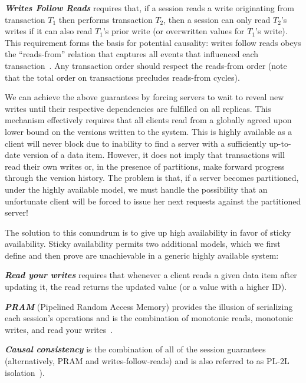 \vspace{.5em}\noindent\textit{\textbf{Writes Follow Reads}} requires
that, if a session reads a write originating from transaction $T_1$
then performs transaction $T_2$, then a session can only read $T_2$'s
writes if it can also read $T_1$'s prior write (or overwritten values
for $T_1$'s write). This requirement forms the basis for potential
causality: writes follow reads obeys the ``reads-from'' relation that
captures all events that influenced each
transaction~\cite{causalmemory}. Any transaction order should respect
the reads-from order (note that the total order on transactions
precludes reads-from cycles).\vspace{.5em}

We can achieve the above guarantees by forcing servers to wait to
reveal new writes until their respective dependencies are fulfilled on
all replicas. This mechanism effectively requires that all clients
read from a globally agreed upon lower bound on the versions written
to the system. This is highly available as a client will never block
due to inability to find a server with a sufficiently up-to-date
version of a data item. However, it does not imply that transactions
will read their own writes or, in the presence of partitions, make
forward progress through the version history. The problem is that, if
a server becomes partitioned, under the highly available model, we
must handle the possibility that an unfortunate client will be forced
to issue her next requests against the partitioned server!

The solution to this conundrum is to give up high availability in
favor of sticky availability. Sticky availability permits two
additional models, which we first define and then prove are
unachievable in a generic highly available system:

\vspace{.5em}\noindent\textit{\textbf{Read your writes}} requires
that whenever a client reads a given data item after updating it, the
read returns the updated value (or a value with a higher ID).

\vspace{.5em}\noindent\textit{\textbf{PRAM}} (Pipelined Random Access
Memory) provides the illusion of serializing each session's operations
and is the combination of monotonic reads, monotonic writes, and read
your writes~\cite{herlihy-art}.

\vspace{.5em}\noindent\textit{\textbf{Causal consistency}} is the combination of
all of the session guarantees~\cite{sessiontocausal} (alternatively,
PRAM and writes-follow-reads) and is also referred to as PL-2L
isolation~\cite{adya}).\vspace{.5em}


